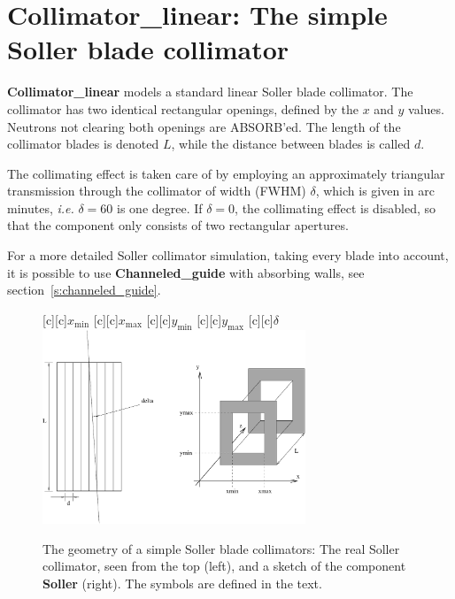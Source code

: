 \section{Collimator\_linear: The simple Soller blade collimator}
\label{collimator-linear}


\textbf{Collimator\_linear} models a standard linear Soller blade collimator.
The collimator has two identical rectangular openings,
defined by the $x$ and $y$ values. Neutrons not clearing both
openings are ABSORB'ed.
The length of the collimator blades is denoted $L$, while
the distance between blades is called $d$.

The collimating effect is taken care of by employing an approximately
triangular transmission through the collimator of width (FWHM) $\delta$, 
which is given in arc minutes, {\em i.e.} $\delta=60$ is one degree.
If $\delta=0$, the collimating effect is disabled,
so that the component only consists of two rectangular apertures.

For a more detailed Soller collimator simulation,
taking every blade into account, it is possible to use
\textbf{Channeled\_guide} with absorbing walls, 
see section~\ref{s:channeled_guide}.

\begin{figure}[h!]
  \begin{center}
    [c][c]{$x_\textrm{min}$}
    [c][c]{$x_\textrm{max}$}
    [c][c]{$y_\textrm{min}$}
    [c][c]{$y_\textrm{max}$}
    [c][c]{$\delta$}
    \includegraphics[width=0.7\textwidth]{figures/collimator}
  \end{center}
\caption{The geometry of a simple Soller blade collimators:
The real Soller collimator, seen from the top (left),
and a sketch of the component \textbf{Soller} (right).
The symbols are defined in the text.}
\label{f:collimator}
\end{figure}

